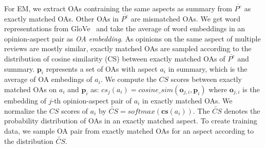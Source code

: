 {For EM,
we extract OAs contraining the same aspects as summary from $\overline{P^e}$ as exactly matched OAs.
Other OAs in $\overline{P^e}$ are mismatched OAs.
{%
We get word representations from GloVe~\cite{glove}
and take the average of word embeddings in an opinion-aspect pair
as {\em OA embedding}.
As opinions on the same aspect of multiple reviews are mostly similar,
exactly matched OAs are sampled according to
the distribution of cosine similarity (CS) 
between exactly matched OAs of $\overline{P^e}$ and summary.
$\boldsymbol{p}_i$ represents a set of OAs with aspect $a_i$ in summary,
which is the average of OA embedings of $a_i$.
 We compute the $CS$ scores between exactly matched OAs on $a_i$ and $\boldsymbol{p}_i$ as: $cs_j(a_i)=cosine\_sim(\boldsymbol{o}_{j,i}, \boldsymbol{p}_{i})$
where $\boldsymbol{o}_{j,i}$ is the embedding of $j$-th opinion-aspect pair of $a_i$ in exactly matched OAs.
We normalize the $CS$ scores of $a_i$
by $\widetilde{CS}=softmax(\mathbf{cs}(a_i))$. 
The $\widetilde{CS}$ denotes the probability distribution 
of OAs in an exactly matched aspect.
To create training data,
we sample OA pair from exactly matched OAs for an aspect
according to the distribution $\widetilde{CS}$. %
}}
